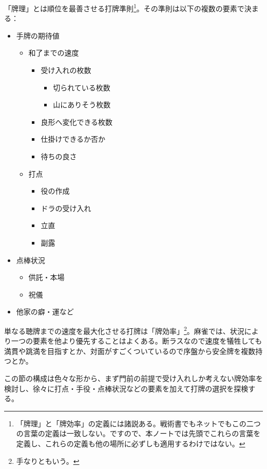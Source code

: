 \documentclass[../nankiru_main.tex]{subfiles}
\begin{document}

「牌理」とは順位を最善させる打牌準則\footnote{「牌理」と「牌効率」の定義には諸説ある。戦術書でもネットでもこの二つの言葉の定義は一致しない。ですので、本ノートでは先頭でこれらの言葉を定義し、これらの定義も他の場所に必ずしも適用するわけではない。}。その準則は以下の複数の要素で決まる：

\begin{itemize}
  \item 手牌の期待値
  \begin{itemize}
    \item 和了までの速度
    \begin{itemize}
      \item 受け入れの枚数
      \begin{itemize}
        \item 切られている枚数
        \item 山にありそう枚数
      \end{itemize}
      \item 良形へ変化できる枚数
      \item 仕掛けできるか否か
      \item 待ちの良さ
    \end{itemize}
    
    \item 打点
    \begin{itemize}
      \item 役の作成
      \item ドラの受け入れ
      \item 立直
      \item 副露
    \end{itemize}
  \end{itemize}
  
  \item 点棒状況
  \begin{itemize}
    \item 供託・本場
    \item 祝儀
  \end{itemize}
  \item 他家の癖・運など
\end{itemize}

単なる聴牌までの速度を最大化させる打牌は「牌効率」\footnote{手なりともいう。}。麻雀では、状況により一つの要素を他より優先することはよくある。断ラスなので速度を犠牲しても満貫や跳満を目指すとか、対面がすごくついているので序盤から安全牌を複数持つとか。

この節の構成は色々な形から、まず門前の前提で受け入れしか考えない牌効率を検討し、徐々に打点・手役・点棒状況などの要素を加えて打牌の選択を探検する。
\end{document}
